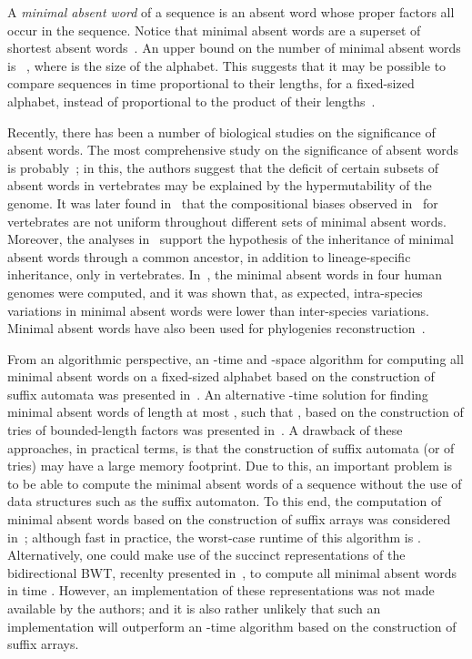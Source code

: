 \documentclass{llncs}
\begin{document}
  A \textit{minimal absent word} of a sequence is an absent word whose proper factors all occur in the sequence.
  Notice that minimal absent words are a superset of shortest absent words~\cite{Pinho2009}. 
  An upper bound on the number of minimal absent words is ~\cite{Crochemore98automataand,Mignosi02}, where  is the size of the alphabet.
  This suggests that it may be possible to compare sequences in time proportional to their lengths, for a fixed-sized alphabet, instead of proportional to
  the product of their lengths~\cite{HauboldPMW05}. 
  
  Recently, there has been a number of biological studies on the significance of absent words.
  The most comprehensive study on the significance of absent words is probably~\cite{nullrly}; in this, the authors suggest that the deficit of certain subsets of absent words 
  in vertebrates may be explained by the hypermutability of the genome. It was later found in~\cite{minabpro} that the compositional biases observed in~\cite{nullrly} for vertebrates 
  are not uniform throughout different sets of minimal absent words. Moreover, the analyses in~\cite{minabpro} support the hypothesis of the inheritance of minimal absent words through a common ancestor, 
  in addition to lineage-specific inheritance, only in vertebrates. In~\cite{citeulike:10180507}, the minimal absent words in four human genomes were computed, and it was shown that, as expected, 
  intra-species variations in minimal absent words were lower than inter-species variations. Minimal absent words have also been used for phylogenies reconstruction~\cite{Chairungsee2012109}.
  
  From an algorithmic perspective, an -time and -space algorithm for computing all minimal absent words on a fixed-sized alphabet based on the construction of suffix automata was presented 
  in~\cite{Crochemore98automataand}. An alternative -time solution for finding minimal absent words of length at most , such that , based on the construction of tries of 
  bounded-length factors was presented in~\cite{Chairungsee2012109}. A drawback of these approaches, in practical terms, is that the construction of suffix automata (or of tries) 
  may have a large memory footprint. Due to this, an important problem is to be able to compute the minimal absent words of a sequence without the use of data structures such as the suffix automaton.
  To this end, the computation of minimal absent words based on the construction of suffix arrays was considered in~\cite{Pinho2009}; although fast in practice, the worst-case runtime of this algorithm is .
  Alternatively, one could make use of the succinct representations of the bidirectional BWT, recenlty presented in~\cite{Belazzougui2013}, to compute all minimal absent words in time .
  However, an implementation of these representations was not made available by the authors; and it is also rather unlikely that such an implementation will outperform an -time algorithm based on
  the construction of suffix arrays.
\end{document}
